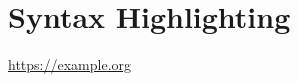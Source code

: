 \chapter{Syntax Highlighting}

\url{https://example.org}
\captionsetup{type=figure}



\Blinddocument
